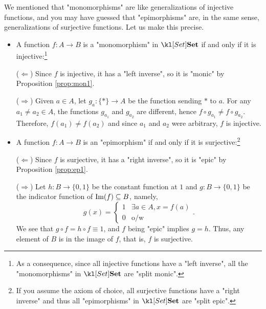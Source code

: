 \documentclass[main.tex]{subfiles}
\begin{document}
\begin{exmp}[$\catSet$]
	We mentioned that "monomorphisms" are like generalizations of injective functions, and you may have guessed that "epimorphisms" are, in the same sense, generalizations of surjective functions. Let us make this precise.
	\begin{itemize}
		\item A function $f:A\rightarrow B$ is a "monomorphism" in $\catSet$ if and only if it is injective:\footnote{As a consequence, since all injective functions have a "left inverse", all the "monomorphisms" in $\catSet$ are "split monic".}
		
		($\Leftarrow$) Since $f$ is injective, it has a "left inverse", so it is "monic" by Proposition \ref{prop:mon1}.
		
		($\Rightarrow$) Given $a \in A$, let $g_a: \{\ast\} \rightarrow A$ be the function sending $\ast$ to $a$. For any $a_1 \neq a_2 \in A$, the functions $g_{a_1}$ and $g_{a_2}$ are different, hence $f \circ g_{a_1} \neq f \circ g_{a_2}$. Therefore, $f(a_1) \neq f(a_2)$ and since $a_1$ and $a_2$ were arbitrary, $f$ is injective.
		
		\item A function $f:A\rightarrow B$ is an "epimorphism" if and only if it is surjective:\footnote{If you assume the axiom of choice, all surjective functions have a "right inverse" and thus all "epimorphisms" in $\catSet$ are "split epic".}
		
		($\Leftarrow$) Since $f$ is surjective, it has a "right inverse", so it is "epic" by Proposition \ref{prop:ep1}.
		
		($\Rightarrow$) Let $h: B \rightarrow \{0,1\}$ be the constant function at $1$ and $g:B \rightarrow \{0,1\}$ be the indicator function of $\operatorname{Im}(f) \subseteq B$, namely, \[g(x) = \begin{cases}1&\exists a \in A, x = f(a)\\0&\text{o/w}\end{cases}.\]
		We see that $g \circ f = h\circ f \equiv 1$, and $f$ being "epic" implies $g = h$. Thus, any element of $B$ is in the image of $f$, that is, $f$ is surjective.
	\end{itemize}
\end{exmp}
\end{document}
